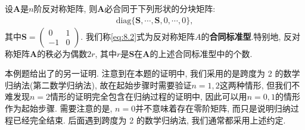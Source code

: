 \documentclass[../../main.tex]{subfiles}%
\begin{document}
\begin{theorem}[反对称矩阵的合同标准型]\label{theorem:反对称矩阵的合同标准型}
设$\boldsymbol{A}$是$n$阶反对称矩阵, 则$\boldsymbol{A}$必合同于下列形状的分块矩阵:
\begin{align}
\text{diag}\{\boldsymbol{S}, \cdots, \boldsymbol{S}, 0, \cdots, 0\}, \label{eq:8.2}
\end{align}
其中$\boldsymbol{S}=\begin{pmatrix}
0 & 1 \\
-1 & 0
\end{pmatrix}$. 我们称\eqref{eq:8.2}式为反对称矩阵$A$的\textbf{合同标准型}.特别地, 反对称矩阵$\boldsymbol{A}$的秩必为偶数$2r$, 其中$r$是$\boldsymbol{S}$在$\boldsymbol{A}$的上述合同标准型中的个数.
\end{theorem}
\begin{remark}
本例题给出了的另一证明. 注意到在本题的证明中, 我们采用的是跨度为 2 的数学归纳法(第二数学归纳法), 故在起始步骤时需要验证$n = 1, 2$这两种情形, 但我们不难发现$n = 2$情形的证明完全包含在归纳过程的证明中, 因此可以用$n = 0, 1$的情形作为起始步骤. 需要注意的是, $n = 0$并不意味着存在零阶矩阵, 而只是说明归纳过程已经完全结束. 后面遇到跨度为 2 的数学归纳法, 我们通常都采用上述约定. 
\end{remark}
\end{document}
